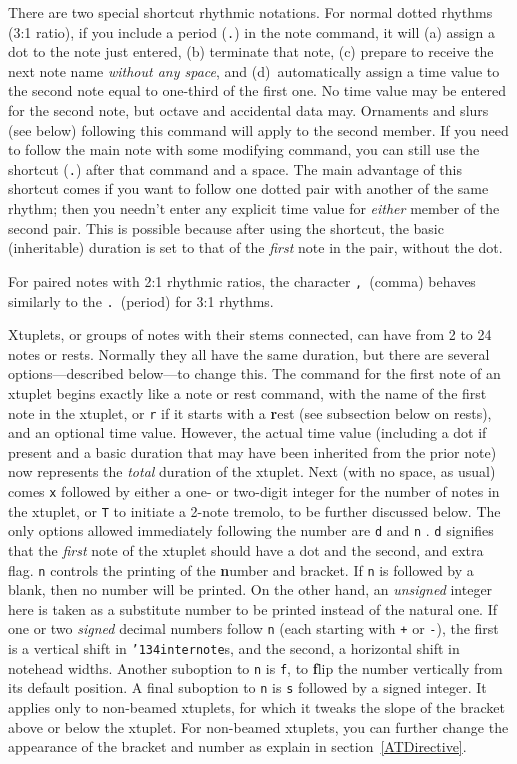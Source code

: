 \documentclass[11pt]{article}
\def\bs{{\tt\char'134}}
\def\newfrom{2.59}  %
\def\NEW#1{\ifdim#1 pt<\newfrom pt\else%
\marginpar{\fbox{#1}}\fi}
\begin{document}
	There are two special shortcut rhythmic notations.  For normal dotted
rhythms (3:1 ratio), if you    
include a period ({\tt .}) in the note command, it will 
(a) assign a dot to the note just entered, (b) terminate that note, 
(c) prepare to 
receive the next note name {\it without any space}, and (d)~automatically 
assign a time value to the second note equal to one-third of the first one.
No time value may be entered for the second note, but octave and accidental
data may.  Ornaments and slurs (see below) following this command will apply 
to the second member. If you need to follow the main note 
with some modifying 
\NEW{2.3} 
command, you can still use the shortcut ({\tt .}) after that command and a
space. 
The main advantage of this shortcut comes if you want to 
follow one dotted pair with another of the same rhythm; then you 
needn't enter any explicit time value for {\it either} member of the second pair.  
This is possible because after using the shortcut,
the basic (inheritable) duration is set to that of the
{\it first} note in the pair, without the dot.

     For paired notes with 2:1 rhythmic ratios, the character {\tt ,}~(comma)
behaves similarly to the {\tt .}~(period) for 3:1 rhythms.

	Xtuplets, or groups of notes with their stems connected,
can have from 2 to 24 notes or\NEW{1.4} rests. Normally they
all have the same duration, but there are several options---described
below---to change this. The command for the first note of an xtuplet begins 
exactly like a 
note or rest command, with the name of the first note in the xtuplet, or
{\tt r} if it starts with a {\bf r}est (see subsection below on rests), 
and an optional time value.  
However, the actual time value (including a dot if present and a basic 
duration that may have been inherited from the prior note) now represents the 
{\it total} duration of the xtuplet.  Next (with no space, as usual) comes 
{\tt x} followed by either a one- or two-digit integer for the number of notes in 
the xtuplet, or \NEW{2.80}{\tt T} to initiate a 2-note tremolo, to be further
discussed below. The only options allowed immediately following the number are 
{\tt d} and {\tt n} . \NEW{2.4}{\tt d} signifies that the {\it first} note 
of the xtuplet should have a dot and the second, and extra flag.  
{\tt n} controls the printing of the {\bf n}umber and bracket. 
If {\tt n} is followed by a blank, then no number will be
printed. On the other hand, 
an \NEW{2.3}{\it unsigned} integer here is taken as a substitute number to
be printed instead of the natural one.  
If one or two {\it signed} decimal numbers follow {\tt n} 
(each starting with {\tt +} or {\tt -}), the first 
is a vertical shift in {\tt \bs internote}s, and the second, a horizontal shift 
in notehead widths. Another suboption to {\tt n} is {\tt f}, 
to {\bf f}lip the number vertically from its default position. A \NEW{2.5}final 
suboption to {\tt n} is {\tt s} followed by a signed integer. It applies only 
to non-beamed xtuplets, for which it tweaks the slope of the bracket above or 
below the xtuplet. For non-beamed xtuplets, you can further change the 
appearance of the bracket and number as explain in section~\ref{ATDirective}.
\end{document}

